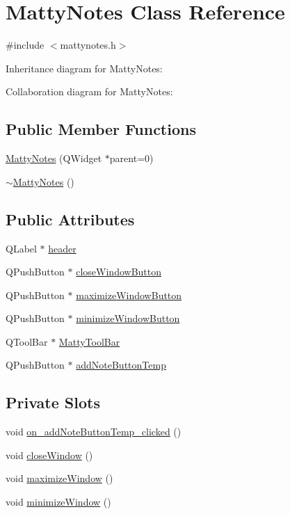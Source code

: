 \hypertarget{classMattyNotes}{}\section{Matty\+Notes Class Reference}
\label{classMattyNotes}


{\ttfamily \#include $<$mattynotes.\+h$>$}



Inheritance diagram for Matty\+Notes\+:


Collaboration diagram for Matty\+Notes\+:
\subsection*{Public Member Functions}
\begin{DoxyCompactItemize}
\item 
\hyperlink{classMattyNotes_aa81db851f82183700abb0b7cd1ba2299}{Matty\+Notes} (Q\+Widget $\ast$parent=0)
\item 
\hyperlink{classMattyNotes_aff7466ee8047ed0293c62df37d245906}{$\sim$\+Matty\+Notes} ()
\end{DoxyCompactItemize}
\subsection*{Public Attributes}
\begin{DoxyCompactItemize}
\item 
Q\+Label $\ast$ \hyperlink{classMattyNotes_a855747a36f73f173f3d8f468c7196572}{header}
\item 
Q\+Push\+Button $\ast$ \hyperlink{classMattyNotes_ac72ba30ddc403561ed6904c4678caaaf}{close\+Window\+Button}
\item 
Q\+Push\+Button $\ast$ \hyperlink{classMattyNotes_a489ab2a613831dd27ba01eccf323235a}{maximize\+Window\+Button}
\item 
Q\+Push\+Button $\ast$ \hyperlink{classMattyNotes_a7d7fc5932df5ad6d5cee0fffe2a2feef}{minimize\+Window\+Button}
\item 
Q\+Tool\+Bar $\ast$ \hyperlink{classMattyNotes_ac780e9814bcce6c80afb9cc22d2b9af6}{Matty\+Tool\+Bar}
\item 
Q\+Push\+Button $\ast$ \hyperlink{classMattyNotes_a319952a9839f335ab9856b83369ea454}{add\+Note\+Button\+Temp}
\end{DoxyCompactItemize}
\subsection*{Private Slots}
\begin{DoxyCompactItemize}
\item 
void \hyperlink{classMattyNotes_a03ee529c5492bc8d73a8a93ecc32c394}{on\+\_\+add\+Note\+Button\+Temp\+\_\+clicked} ()
\item 
void \hyperlink{classMattyNotes_a63c0d10781a0acc57387682282aded37}{close\+Window} ()
\item 
void \hyperlink{classMattyNotes_a49cfcd1087c5f3c0c9f5ced2b7675e6f}{maximize\+Window} ()
\item 
void \hyperlink{classMattyNotes_a59034e42bf605fafd6b37e513b6f85fb}{minimize\+Window} ()
\end{DoxyCompactItemize}
